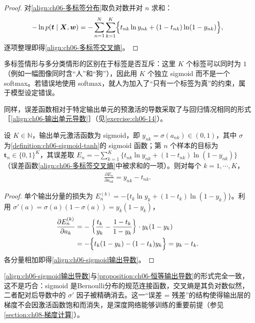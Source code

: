 \documentclass[../../main.tex]{subfiles}
\begin{document}
\begin{proof}
对\eqref{align:ch06-多标签分布}取负对数并对 $n$ 求和：
\begin{align}
-\ln p(\boldsymbol{t}\mid\boldsymbol{X},\boldsymbol{w})
=-\sum_{n=1}^{N}\sum_{k=1}^{K}\Bigl\{t_{nk}\ln y_{nk}+(1-t_{nk})\ln(1-y_{nk})\Bigr\},
\end{align}
逐项整理即得\eqref{align:ch06-多标签交叉熵}。
\end{proof}

\begin{remark}多标签情形与多分类情形的区别在于标签是否互斥：这里 $K$ 个标签可以同时为 $1$（例如一幅图像同时含“人”和“狗”），因此用 $K$ 个独立 sigmoid 而不是一个 softmax。若错误地使用 softmax，就人为加入了“只有一个标签为真”的约束，属于模型设定错误。
\end{remark}

同样，误差函数相对于特定输出单元的预激活的导数采取了与回归情况相同的形式［\eqref{align:ch06-输出单元导数}］（见\cref{exercise:ch06-14}）。

\begin{proposition}\label{proposition:ch06-sigmoid输出导数}
设 $K\in\mathbb{N}$，输出单元激活函数为 sigmoid，即 $y_{nk}=\sigma(a_{nk})\in(0,1)$，其中 $\sigma$ 为\cref{definition:ch06-sigmoid-tanh}的 sigmoid 函数；第 $n$ 个样本的目标为 $\boldsymbol{t}_{n}\in\{0,1\}^{K}$，其误差取 $E_{n}=-\sum_{k=1}^{K}\{t_{nk}\ln y_{nk}+(1-t_{nk})\ln(1-y_{nk})\}$（误差函数\eqref{align:ch06-多标签交叉熵}中被求和的一项）。则对每个 $k=1,\cdots,K$，
\begin{align}
\frac{\partial E_n}{\partial a_{nk}}=y_{nk}-t_{nk}.
\label{align:ch06-sigmoid输出导数}
\end{align}
\end{proposition}

\begin{proof}
单个输出分量的损失为 $E_n^{(k)}=-\{t_k\ln y_k+(1-t_k)\ln(1-y_k)\}$。利用 $\sigma'(a)=\sigma(a)(1-\sigma(a))=y_k(1-y_k)$，
\begin{align}
\frac{\partial E_n^{(k)}}{\partial a_k}
&=-\left\{\frac{t_k}{y_k}-\frac{1-t_k}{1-y_k}\right\}\cdot y_k(1-y_k)\nonumber\\
&=-\Bigl\{t_k(1-y_k)-(1-t_k)y_k\Bigr\}=y_k-t_k .
\end{align}
各分量相加即得\eqref{align:ch06-sigmoid输出导数}。
\end{proof}

\begin{remark}\eqref{align:ch06-sigmoid输出导数}与\cref{proposition:ch06-恒等输出导数}的形式完全一致，这不是巧合：sigmoid 是Bernoulli分布的规范连接函数，交叉熵是其负对数似然，二者配对后导数中的 $\sigma'$ 因子被精确消去。这一“误差 = 残差”的结构使得输出层的梯度不会因激活函数饱和而消失，是深度网络能够训练的重要前提（参见\cref{section:ch08-梯度计算}）。
\end{remark}
\end{document}
